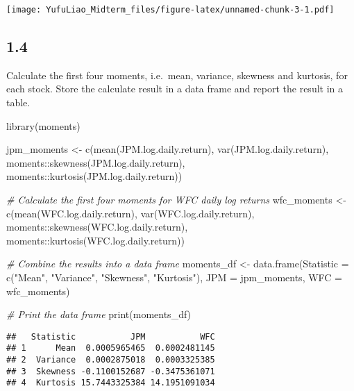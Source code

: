 \documentclass[
]{article}
\newenvironment{Shaded}{\begin{snugshade}}{\end{snugshade}}
\newcommand{\AttributeTok}[1]{\textcolor[rgb]{0.77,0.63,0.00}{#1}}
\newcommand{\CommentTok}[1]{\textcolor[rgb]{0.56,0.35,0.01}{\textit{#1}}}
\newcommand{\FunctionTok}[1]{\textcolor[rgb]{0.00,0.00,0.00}{#1}}
\newcommand{\NormalTok}[1]{#1}
\newcommand{\OtherTok}[1]{\textcolor[rgb]{0.56,0.35,0.01}{#1}}
\newcommand{\SpecialCharTok}[1]{\textcolor[rgb]{0.00,0.00,0.00}{#1}}
\newcommand{\StringTok}[1]{\textcolor[rgb]{0.31,0.60,0.02}{#1}}
\begin{document}
\texttt{[image: YufuLiao\_Midterm\_files/figure-latex/unnamed-chunk-3-1.pdf]}

\hypertarget{section-3}{%
\subsection{1.4}\label{section-3}}

Calculate the first four moments, i.e.~mean, variance, skewness and
kurtosis, for each stock. Store the calculate result in a data frame and
report the result in a table.

\begin{Shaded}
\begin{Highlighting}[]
\FunctionTok{library}\NormalTok{(}\StringTok{\textquotesingle{}moments\textquotesingle{}}\NormalTok{)}

\NormalTok{jpm\_moments }\OtherTok{\textless{}{-}} \FunctionTok{c}\NormalTok{(}\FunctionTok{mean}\NormalTok{(JPM.log.daily.return), }\FunctionTok{var}\NormalTok{(JPM.log.daily.return), moments}\SpecialCharTok{::}\FunctionTok{skewness}\NormalTok{(JPM.log.daily.return), moments}\SpecialCharTok{::}\FunctionTok{kurtosis}\NormalTok{(JPM.log.daily.return))}

\CommentTok{\# Calculate the first four moments for WFC daily log returns}
\NormalTok{wfc\_moments }\OtherTok{\textless{}{-}} \FunctionTok{c}\NormalTok{(}\FunctionTok{mean}\NormalTok{(WFC.log.daily.return), }\FunctionTok{var}\NormalTok{(WFC.log.daily.return), moments}\SpecialCharTok{::}\FunctionTok{skewness}\NormalTok{(WFC.log.daily.return), moments}\SpecialCharTok{::}\FunctionTok{kurtosis}\NormalTok{(WFC.log.daily.return))}

\CommentTok{\# Combine the results into a data frame}
\NormalTok{moments\_df }\OtherTok{\textless{}{-}} \FunctionTok{data.frame}\NormalTok{(}\AttributeTok{Statistic =} \FunctionTok{c}\NormalTok{(}\StringTok{"Mean"}\NormalTok{, }\StringTok{"Variance"}\NormalTok{, }\StringTok{"Skewness"}\NormalTok{, }\StringTok{"Kurtosis"}\NormalTok{), }\AttributeTok{JPM =}\NormalTok{ jpm\_moments, }\AttributeTok{WFC =}\NormalTok{ wfc\_moments)}

\CommentTok{\# Print the data frame}
\FunctionTok{print}\NormalTok{(moments\_df)}
\end{Highlighting}
\end{Shaded}

\begin{verbatim}
##   Statistic           JPM           WFC
## 1      Mean  0.0005965465  0.0002481145
## 2  Variance  0.0002875018  0.0003325385
## 3  Skewness -0.1100152687 -0.3475361071
## 4  Kurtosis 15.7443325384 14.1951091034
\end{verbatim}
\end{document}

